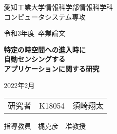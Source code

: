 \thispagestyle{myheadings}

\vspace{-1.0cm}

\begin{center}

{\LARGE 愛知工業大学情報科学部情報科学科\\
コンピュータシステム専攻

\vspace{1.0cm}

令和3年度~卒業論文\\

\vspace{2.0cm}

{\Huge 
\baselineskip=15mm
\textbf{特定の時空間への進入時に\\
自動センシングする\\
アプリケーションに関する研究\\}}

\vspace{7.0cm}

2022年2月\\

\vspace{1.0cm}

\begin{tabular}[h]{lll}
  研究者  & K18054 & 須崎翔太
\end{tabular}

\vspace{1.0cm}

指導教員\ \ 梶克彦\ \ 准教授}

\end{center}

